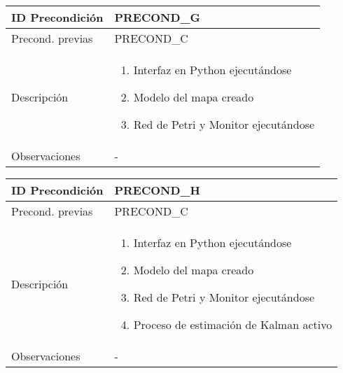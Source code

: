 \sffamily \small \begin{center} \begin{tabular} {|p{3cm}|p{9cm}|}
    \hline \rowcolor{precond_header_color}
        ID Precondición     & PRECOND\_G \\
    \hline
        Precond. previas    & PRECOND\_C \\
    \hline
        Descripción         & \begin{enumerate}
                                \item Interfaz en Python ejecutándose
                                \item Modelo del mapa creado
                                \item Red de Petri y Monitor ejecutándose
                            \end{enumerate} \\
    \hline
        Observaciones       & - \\
    \hline
\end{tabular} \end{center} \normalsize \normalfont


\sffamily \small \begin{center} \begin{tabular} {|p{3cm}|p{9cm}|}
    \hline \rowcolor{precond_header_color}
        ID Precondición     & PRECOND\_H \\
    \hline
        Precond. previas    & PRECOND\_C \\
    \hline
        Descripción         & \begin{enumerate}
                                \item Interfaz en Python ejecutándose
                                \item Modelo del mapa creado
                                \item Red de Petri y Monitor ejecutándose
                                \item Proceso de estimación de Kalman activo
                            \end{enumerate} \\
    \hline
        Observaciones       & - \\
    \hline
\end{tabular} \end{center} \normalsize \normalfont


